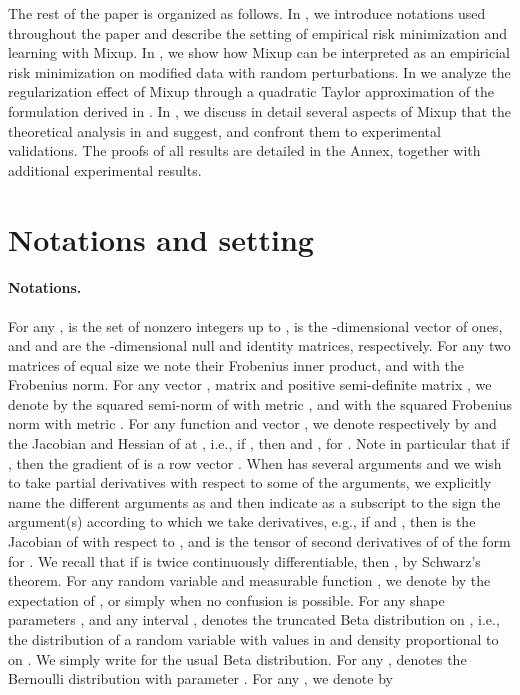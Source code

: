 \documentclass[twoside,11pt]{article}
\begin{document}
The rest of the paper is organized as follows. In , we introduce notations used throughout the paper and describe the setting of empirical risk minimization and learning with Mixup. In , we show how Mixup can be interpreted as an empiricial risk minimization on modified data with random perturbations. In  we analyze the regularization effect of Mixup through a quadratic Taylor approximation of the formulation derived in . In , we discuss in detail several aspects of Mixup that the theoretical analysis in  and  suggest, and confront them to experimental validations. The proofs of all results are detailed in the Annex, together with additional experimental results.











\section{Notations and setting}\label{sec:notations}

\paragraph{Notations.}
For any ,  is the set of nonzero integers up to ,
 is the -dimensional vector of ones, 
and  and  are the -dimensional null and identity matrices, respectively.
For any two matrices  of equal size we note  their 
Frobenius inner product, and with  the Frobenius norm.
For any vector , matrix  and positive semi-definite matrix 
, we denote by  
the squared semi-norm of  with metric , and with 
the squared Frobenius norm with metric . 
For any function  and vector ,
we denote respectively by  and  the Jacobian and Hessian of  at , i.e., if , then  and , for . Note in particular that if , then the gradient of  is a row vector . When  has several arguments and we wish to take partial derivatives with respect to some of the arguments, we explicitly name the different arguments as  and then indicate as a subscript to the  sign the argument(s) according to which we take derivatives, e.g., if  and , then  is the Jacobian of  with respect to , and  is the tensor of second derivatives of  of the form  for . We recall that if  is twice continuously differentiable, then , by Schwarz's theorem. For any random variable  and measurable function , we denote by  the expectation of , or simply  when no confusion is possible. For any shape parameters , and any interval ,  denotes the truncated Beta distribution on , i.e., the distribution of a random variable with values in  and density proportional to  on . We simply write  for the usual Beta distribution. For any ,  denotes the Bernoulli distribution with parameter . For any , we denote by 
\end{document}
